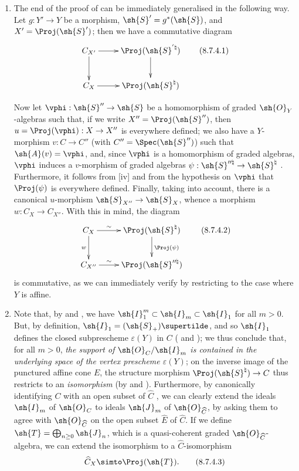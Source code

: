 \begin{remark}[8.7.4]
\label{II.8.7.4}
\begin{enumerate}
  \item[\rm{(i)}] The end of the proof of  can be immediately generalised in the following way.
    Let $g:Y'\to Y$ be a morphism, $\sh{S}'=g^*(\sh{S})$, and $X'=\Proj(\sh{S}')$;
    then we have a commutative diagram
    \[
    \label{II.8.7.4.1}
      \xymatrix{
        C_{X'}
          \ar[r]
          \ar[d]
      & \Proj(\sh{S}^{'\natural})
          \ar[d]
      \\C_X
          \ar[r]
      & \Proj(\sh{S}^\natural)
      }
    \tag{8.7.4.1}
    \]

    Now let $\vphi:\sh{S}''\to\sh{S}$ be a homomorphism of graded $\sh{O}_Y$-algebras such that, if we write $X''=\Proj(\sh{S}'')$, then $u=\Proj(\vphi):X\to X''$ is everywhere defined;
    we also have
    a $Y$-morphism $v:C\to C''$ (with $C''=\Spec(\sh{S}'')$) such that $\sh{A}(v)=\vphi$, and, since $\vphi$ is a homomorphism of graded algebras, $\vphi$ induces a $v$-morphism of graded algebras $\psi:\sh{S}^{\prime\prime\natural}\to\sh{S}^\natural$ .
    Furthermore, it follows from [iv] and from the hypothesis on $\vphi$ that $\Proj(\psi)$ is everywhere defined.
    Finally, taking  into account, there is a canonical $u$-morphism $\sh{S}_{X''}\to\sh{S}_X$, whence  a morphism $w:C_X\to C_{X''}$.
    With this in mind, the diagram
    \[
    \label{II.8.7.4.2}
      \xymatrix{
        C_X
          \ar[r]^-{\sim}
          \ar[d]_{w}
      & \Proj(\sh{S}^\natural)
          \ar[d]^{\Proj(\psi)}
      \\C_{X''}
          \ar[r]^-{\sim}
      & \Proj(\sh{S}^{\prime\prime\natural})
      }
    \tag{8.7.4.2}
    \]
    is commutative, as we can immediately verify by restricting to the case where $Y$ is affine.
  \item[\rm{(ii)}] Note that, by  and , we have $\sh{I}_1^m\subset\sh{I}_m\subset\sh{I}_1$ for all $m>0$.
    But, by definition, $\sh{I}_1=(\sh{S}_+)\supertilde$, and so $\sh{I}_1$ defines the closed subprescheme $\varepsilon(Y)$ in $C$ ( and );
    we thus conclude that, for all $m>0$, \emph{the support of $\sh{O}_C/\sh{I}_m$ is contained in the underlying space of the vertex prescheme $\varepsilon(Y)$};
    on the inverse image of the punctured affine cone $E$, the structure morphism $\Proj(\sh{S}^\natural)\to C$ thus restricts to an \emph{isomorphism} (by  and ).
    Furthermore, by canonically identifying $C$ with an open subset of $\widehat{C}$ , we can clearly extend the ideals $\sh{I}_m$ of $\sh{O}_C$ to ideals $\sh{J}_m$ of $\sh{O}_{\widehat{C}}$, by asking them to agree with $\sh{O}_{\widehat{C}}$ on the open subset $\widehat{E}$ of $\widehat{C}$.
    If we define $\sh{T}=\bigoplus_{n\geq 0}\sh{J}_n$, which is a quasi-coherent graded $\sh{O}_{\widehat{C}}$-algebra, we can extend the isomorphism  to a $\widehat{C}$-isomorphism
    \[
    \label{II.8.7.4.3}
      \widehat{C}_X \simto \Proj(\sh{T}).
    \tag{8.7.4.3}
    \]


\end{enumerate}
\end{remark}
